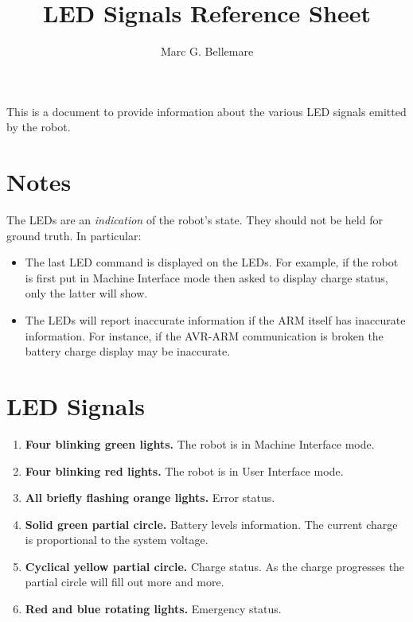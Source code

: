 \documentclass[12pt]{article}
\author{Marc G. Bellemare}
\title{LED Signals Reference Sheet}
\newcommand{\kw}[1]{{\bf #1}}
\begin{document}
\maketitle

This is a document to provide information about the various LED signals 
emitted by the robot.

\section{Notes}

The LEDs are an \emph{indication} of the robot's state. They should not be
held for ground truth. In particular:

\begin{itemize}
  \item{The last LED command is displayed on the LEDs. For example, if the robot is first put in Machine Interface mode then asked to display charge status, only the latter will show.}
  \item{The LEDs will report inaccurate information if the ARM itself has inaccurate information. For instance, if the AVR-ARM communication is broken the battery charge display may be inaccurate.}
\end{itemize}

\section{LED Signals}

\begin{enumerate}
  \item{\kw{Four blinking green lights.} The robot is in Machine Interface mode.}
  \item{\kw{Four blinking red lights.} The robot is in User Interface mode.}
  \item{\kw{All briefly flashing orange lights.} Error status.}
  \item{\kw{Solid green partial circle.} Battery levels information. The current charge is proportional to the system voltage.}
  \item{\kw{Cyclical yellow partial circle.} Charge status. As the charge progresses the partial circle will fill out more and more.}
  \item{\kw{Red and blue rotating lights.} Emergency status.}
\end{enumerate}
\end{document}
